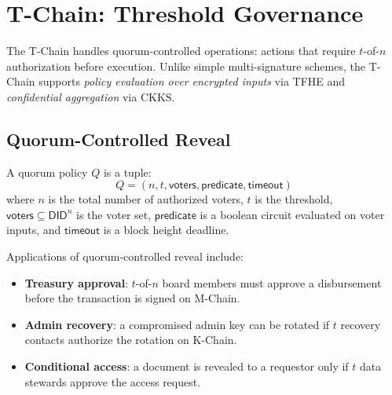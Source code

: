 

\section{T-Chain: Threshold Governance}
\label{sec:tchain}

The T-Chain handles quorum-controlled operations: actions that require $t$-of-$n$
authorization before execution. Unlike simple multi-signature schemes, the T-Chain
supports \emph{policy evaluation over encrypted inputs} via TFHE and \emph{confidential
aggregation} via CKKS.

\subsection{Quorum-Controlled Reveal}

\begin{definition}\label{def:quorum}
A quorum policy $Q$ is a tuple:
\[
    Q = (n, t, \mathsf{voters}, \mathsf{predicate}, \mathsf{timeout})
\]
where $n$ is the total number of authorized voters, $t$ is the threshold,
$\mathsf{voters} \subseteq \mathsf{DID}^n$ is the voter set,
$\mathsf{predicate}$ is a boolean circuit evaluated on voter inputs,
and $\mathsf{timeout}$ is a block height deadline.
\end{definition}

Applications of quorum-controlled reveal include:
\begin{itemize}
    \item \textbf{Treasury approval}: $t$-of-$n$ board members must approve a
          disbursement before the transaction is signed on M-Chain.
    \item \textbf{Admin recovery}: a compromised admin key can be rotated if $t$
          recovery contacts authorize the rotation on K-Chain.
    \item \textbf{Conditional access}: a document is revealed to a requestor only
          if $t$ data stewards approve the access request.
\end{itemize}

